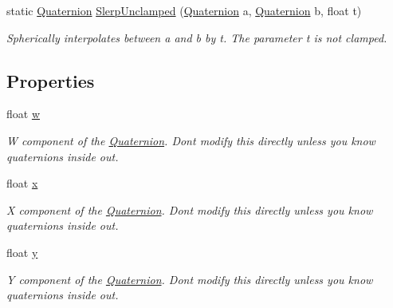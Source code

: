 \begin{DoxyCompactItemize}
static \mbox{\hyperlink{class_lua_1_1_quaternion}{Quaternion}} \mbox{\hyperlink{class_lua_1_1_quaternion_a5056ad858477a4b81765167a068d5379}{Slerp\+Unclamped}} (\mbox{\hyperlink{class_lua_1_1_quaternion}{Quaternion}} a, \mbox{\hyperlink{class_lua_1_1_quaternion}{Quaternion}} b, float t)
\begin{DoxyCompactList}\small\item\em Spherically interpolates between a and b by t. The parameter t is not clamped. \end{DoxyCompactList}\end{DoxyCompactItemize}
\subsection*{Properties}
\begin{DoxyCompactItemize}
\item 
float \mbox{\hyperlink{class_lua_1_1_quaternion_a4a66f5c598907b4d906b0c5dd0e28526}{w}}
\begin{DoxyCompactList}\small\item\em W component of the \mbox{\hyperlink{class_lua_1_1_quaternion}{Quaternion}}. Don\textquotesingle{}t modify this directly unless you know quaternions inside out. \end{DoxyCompactList}\item 
float \mbox{\hyperlink{class_lua_1_1_quaternion_aefb405b7fafa79708a6d8120781debce}{x}}
\begin{DoxyCompactList}\small\item\em X component of the \mbox{\hyperlink{class_lua_1_1_quaternion}{Quaternion}}. Don\textquotesingle{}t modify this directly unless you know quaternions inside out. \end{DoxyCompactList}\item 
float \mbox{\hyperlink{class_lua_1_1_quaternion_ab7eb002a81cfc537a9c3afc8965ef2ec}{y}}
\begin{DoxyCompactList}\small\item\em Y component of the \mbox{\hyperlink{class_lua_1_1_quaternion}{Quaternion}}. Don\textquotesingle{}t modify this directly unless you know quaternions inside out. \end{DoxyCompactList}\item 

\end{DoxyCompactItemize}

